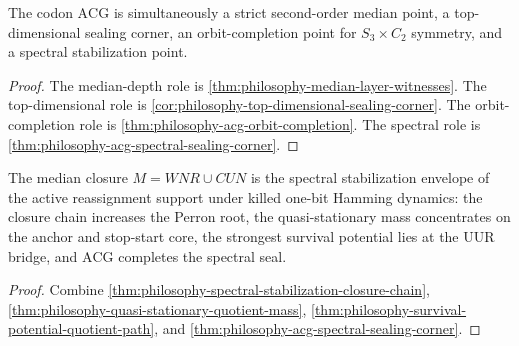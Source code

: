 \begin{corollary}
\label{cor:philosophy-four-roles-acg}
The codon $\mathrm{ACG}$ is simultaneously a strict second-order median
point, a top-dimensional sealing corner, an orbit-completion point for
$S_{3}\times C_{2}$ symmetry, and a spectral stabilization point.
\end{corollary}
\begin{proof}
The median-depth role is
\autoref{thm:philosophy-median-layer-witnesses}. The top-dimensional role is
\autoref{cor:philosophy-top-dimensional-sealing-corner}. The
orbit-completion role is \autoref{thm:philosophy-acg-orbit-completion}.
The spectral role is \autoref{thm:philosophy-acg-spectral-sealing-corner}.
\end{proof}

\begin{theorem}
\label{thm:philosophy-spectral-stabilization-theorem}
The median closure $M=WNR\cup CUN$ is the spectral stabilization
envelope of the active reassignment support under killed one-bit
Hamming dynamics: the closure chain increases the Perron root, the
quasi-stationary mass concentrates on the anchor and stop-start core,
the strongest survival potential lies at the $\mathrm{UUR}$ bridge, and
$\mathrm{ACG}$ completes the spectral seal.
\end{theorem}
\begin{proof}
Combine
\autoref{thm:philosophy-spectral-stabilization-closure-chain},
\autoref{thm:philosophy-quasi-stationary-quotient-mass},
\autoref{thm:philosophy-survival-potential-quotient-path}, and
\autoref{thm:philosophy-acg-spectral-sealing-corner}.
\end{proof}
